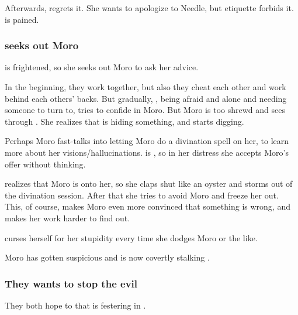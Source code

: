 Afterwards, \Tiroco{} regrets it. 
She wants to apologize to Needle, but etiquette forbids it. 
\Tiroco{} is pained. 





\subsubsection{\Tiroco{} seeks out Moro}
\Tiroco{} is frightened, so she seeks out Moro \Cobrel{} to ask her advice. 

In the beginning, they work together, but also they cheat each other and work behind each others' backs. But gradually, \Tiroco{}, being afraid and alone and needing someone to turn to, tries to confide in Moro. But Moro is too shrewd and sees through \Tiroco. She realizes that \Tiroco{} is hiding something, and starts digging. 

Perhaps Moro fast-talks \Tiroco{} into letting Moro do a divination spell on her, to learn more about her visions/hallucinations. \Tiroco{} is , so in her distress she accepts Moro's offer without thinking.

\Tiroco{} realizes that Moro is onto her, so she claps shut like an oyster and storms out of the divination session. After that she tries to avoid Moro and freeze her out. This, of course, makes Moro even more convinced that something is wrong, and makes her work harder to find out. 

\Tiroco{} curses herself for her stupidity every time she dodges Moro or the like.



Moro has gotten suspicious and is now covertly stalking \Tiroco.





\subsubsection{They wants to stop the evil}
They both hope to  that is festering in \Malcur. 












